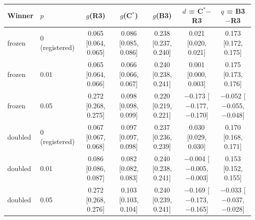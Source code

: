 \begin{tabular}{llccccc}
\toprule
Winner & $p$ & $g$(R3) & $g$(C$^*$) & $g$(B3) & $d$ = C$^*$$-$R3 & $q$ = B3$-$R3 \\
\midrule
frozen & 0 (registered) & 0.065 [0.064, 0.065] & 0.086 [0.085, 0.086] & 0.238 [0.237, 0.240] & 0.021 [0.020, 0.021] & 0.173 [0.172, 0.175] \\
frozen & 0.01 & 0.065 [0.064, 0.066] & 0.066 [0.066, 0.067] & 0.240 [0.238, 0.241] & 0.001 [0.000, 0.003] & 0.175 [0.173, 0.176] \\
frozen & 0.05 & 0.272 [0.268, 0.275] & 0.098 [0.098, 0.099] & 0.220 [0.219, 0.221] & $-$0.173 [$-$0.177, $-$0.170] & $-$0.052 [$-$0.055, $-$0.048] \\
doubled & 0 (registered) & 0.067 [0.067, 0.068] & 0.097 [0.097, 0.098] & 0.237 [0.236, 0.239] & 0.030 [0.029, 0.030] & 0.170 [0.168, 0.171] \\
doubled & 0.01 & 0.086 [0.086, 0.087] & 0.082 [0.082, 0.083] & 0.240 [0.238, 0.241] & $-$0.004 [$-$0.005, $-$0.003] & 0.153 [0.152, 0.155] \\
doubled & 0.05 & 0.272 [0.268, 0.276] & 0.103 [0.103, 0.104] & 0.240 [0.239, 0.241] & $-$0.169 [$-$0.173, $-$0.165] & $-$0.033 [$-$0.037, $-$0.028] \\
\bottomrule
\end{tabular}
